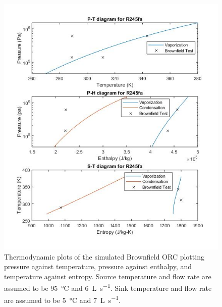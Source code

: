 \begin{figure}%
	\centering

	\includegraphics[width=\textwidth]{figures/BrownfieldThermoPlots}
	\caption{Thermodynamic plots of the simulated Brownfield ORC plotting pressure against temperature, pressure against enthalpy, and temperature against entropy. Source temperature and flow rate are assumed to be \SI{95}{\degreeCelsius} and \SI{6}{\liter\per\second}. Sink temperature and flow rate are assumed to be \SI{5}{\degreeCelsius} and \SI{7}{\liter\per\second}.}
	\label{fig:bf_themoplots}
\end{figure}